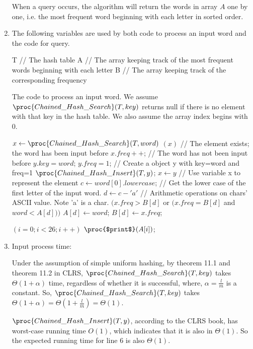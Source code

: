 \documentclass[11pt, answers]{exam}
\theoremstyle{plain}
\theoremstyle{definition}
\begin{document}
\begin{questions}
\begin{solution}
\begin{enumerate}
When a query occurs, the algorithm will return the words in array $A$ one by one, i.e. the most frequent word beginning with each letter in sorted order.

\item 
The following variables are used by both code to process an input word and the code for query.
\begin{codebox}
\li T // The hash table
\li A // The array keeping track of the most frequent words beginning with each letter
\li B // The array keeping track of the corresponding frequency
\end{codebox}
The code to process an input word.
We assume $\proc{Chained\_Hash\_Search}(T, key)$ returns null if there is no element with that key in the hash table.
We also assume the array index begins with 0.
\begin{codebox}
\li $x \gets \proc{Chained\_Hash\_Search}(T, word)$ 
\li \If $(x)$ // The element exists; the word has been input before
\li 	\Then $x.freq++$; 
\li \Else // The word has not been input before
\li 	$y.key=word$; $y.freq=1$; // Create a object y with key=word and freq=1
\li 	$\proc{Chained\_Hash\_Insert}(T, y)$;
\li 	$x\gets y$ \End // Use variable x to represent the element
\li $c \gets word[0].lowercase$; // Get the lower case of the first letter of the input word.
\li $d \gets c-'a'$ // Arithmetic operations on chars' ASCII value. Note 'a' is a char.
\li \If $(x.freq > B[d]$ or $(x.freq=B[d]$ and $word<A[d]))$ 
\li     \Then $A[d] \gets word$;
\li     $B[d] \gets x.freq$; \End
\end{codebox}

\begin{codebox}
\li \For $(i=0; i<26; i++)$ \Do
\li     $\proc{$print$}(A[i])$;
\end{codebox}

\item
Input process time:

Under the assumption of simple uniform hashing, by theorem 11.1 and theorem 11.2 in CLRS, $\proc{Chained\_Hash\_Search}(T, key)$ takes $\Theta{(1+\alpha)}$ time, regardless of whether it is successful, where, $\alpha=\frac{l}{m}$ is a constant. So, $\proc{Chained\_Hash\_Search}(T, key)$ takes $\Theta{(1+\alpha)}=\Theta{(1+\frac{l}{m})}=\Theta{(1)}$. 

$\proc{Chained\_Hash\_Insert}(T, y)$, according to the CLRS book, has worst-case running time $O(1)$, which indicates that it is also in $\Theta{(1)}$. So the expected running time for line 6 is also $\Theta{(1)}$.


\end{enumerate}
\end{solution}
\end{questions}
\end{document}
